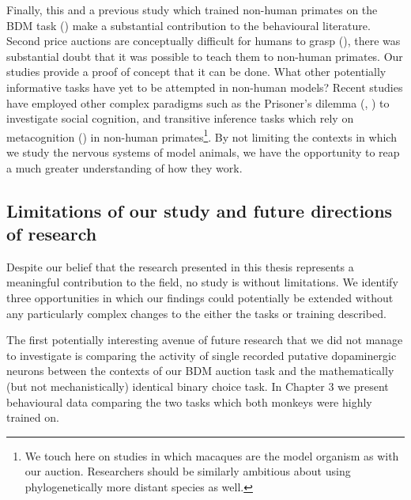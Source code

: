 Finally, this and a previous study which trained non-human primates on the BDM task (\cite{almohammadRewardValueRevealed2022}) make a substantial contribution to the behavioural literature. Second price auctions are conceptually difficult for humans to grasp (\cite{casonMisconceptionsGameForm2014}), there was substantial doubt that it was possible to teach them to non-human primates. Our studies provide a proof of concept that it can be done. What other potentially informative tasks have yet to be attempted in non-human models? Recent studies have employed other complex paradigms such as the Prisoner's dilemma (\cite{haroushNeuronalPredictionOpponents2015}, \cite{vancoeverdenFormalCooperationMacaque2022}) to investigate social cognition, and transitive inference tasks which rely on metacognition (\cite{dibelloPrefrontalCortexContribution2024}) in non-human primates\footnote{We touch here on studies in which macaques are the model organism as with our auction. Researchers should be similarly ambitious about using phylogenetically more distant species as well.}. By not limiting the contexts in which we study the nervous systems of model animals, we have the opportunity to reap a much greater understanding of how they work.

\subsection{Limitations of our study and future directions of  research}

Despite our belief that the research presented in this thesis represents a meaningful contribution to the field, no study is without limitations. We identify three opportunities in which our findings could potentially be extended without any particularly complex changes to the either the tasks or training described.

The first potentially interesting avenue of future research that we did not manage to investigate is comparing the activity of single recorded putative dopaminergic neurons between the contexts of our BDM auction task and the mathematically (but not mechanistically) identical binary choice task. In Chapter 3 we present behavioural data comparing the two tasks which both monkeys were highly trained on.


